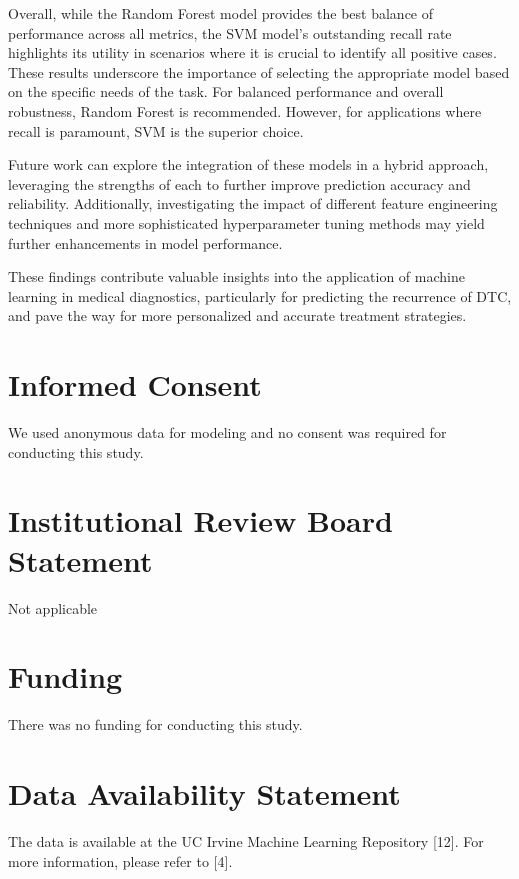 \documentclass[
  letterpaper,
  DIV=11,
  numbers=noendperiod]{scrartcl}
\begin{document}
Overall, while the Random Forest model provides the best balance of
performance across all metrics, the SVM model's outstanding recall rate
highlights its utility in scenarios where it is crucial to identify all
positive cases. These results underscore the importance of selecting the
appropriate model based on the specific needs of the task. For balanced
performance and overall robustness, Random Forest is recommended.
However, for applications where recall is paramount, SVM is the superior
choice.

Future work can explore the integration of these models in a hybrid
approach, leveraging the strengths of each to further improve prediction
accuracy and reliability. Additionally, investigating the impact of
different feature engineering techniques and more sophisticated
hyperparameter tuning methods may yield further enhancements in model
performance.

These findings contribute valuable insights into the application of
machine learning in medical diagnostics, particularly for predicting the
recurrence of DTC, and pave the way for more personalized and accurate
treatment strategies.

\section{Informed Consent}\label{informed-consent}

We used anonymous data for modeling and no consent was required for
conducting this study.

\section{Institutional Review Board
Statement}\label{institutional-review-board-statement}

Not applicable

\section{Funding}\label{funding}

There was no funding for conducting this study.

\section{Data Availability Statement}\label{data-availability-statement}

The data is available at the UC Irvine Machine Learning Repository
{[}12{]}. For more information, please refer to {[}4{]}.
\end{document}
